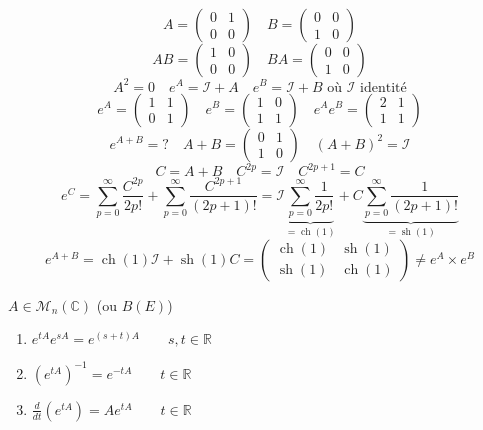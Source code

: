 \documentclass[a4paper]{report}
\newcommand\R{\ensuremath{\mathbb{R}}}
\theoremstyle{definition}
\begin{document}
\begin{remark}
   \[
        A = \begin{pmatrix} 
            0 & 1\\
            0 & 0
        \end{pmatrix}  
        \quad
        B = \begin{pmatrix} 
            0 & 0 \\
            1 & 0
        \end{pmatrix} 
   \]  
   \[
       AB = \begin{pmatrix} 1 & 0 \\ 0 & 0 \end{pmatrix} 
       \quad 
       BA = \begin{pmatrix} 0 & 0 \\ 1 & 0 \end{pmatrix} 
   \] 
   \[
       A^2 = 0 \quad e^A = \mathcal{I} + A \quad e^B = \mathcal{I} + B \text{ où } \mathcal{I} \text{ identité}
   \] 
   \[
       e^A = \begin{pmatrix} 1 & 1 \\ 0 & 1 \end{pmatrix} 
       \quad 
       e^B = \begin{pmatrix} 1 & 0 \\ 1 & 1 \end{pmatrix} 
       \quad 
       e^Ae^B = \begin{pmatrix} 2 & 1 \\ 1 & 1 \end{pmatrix} 
   \] 
   \[
       e^{A+B} = ? \quad A + B = \begin{pmatrix} 0 & 1 \\ 1 & 0 \end{pmatrix} \quad (A + B)^2 = \mathcal{I}
   \] 
   \[
       C = A+B \quad C^{2p} = \mathcal{I} \quad C^{2p + 1} = C
   \] 
   \[
       e^C = \sum_{p=0}^{\infty} \frac{C^{2p}}{2p!} + \sum_{p=0}^{\infty} \frac{C^{2p + 1}}{(2p + 1)!} = \mathcal{I}\underbrace{\sum_{p=0}^{\infty} \frac{1}{2p!}}_{= \operatorname{ch}(1)} + C\underbrace{\sum_{p=0}^{\infty} \frac{1}{(2p + 1)!}}_{= \operatorname{sh}(1)}
   \] 
   \[
       e^{A + B} = \operatorname{ch}(1) \mathcal{I} + \operatorname{sh}(1)C = \begin{pmatrix} \operatorname{ch}(1) & \operatorname{sh}(1) \\ \operatorname{sh}(1) & \operatorname{ch}(1) \end{pmatrix} \neq e^A \times e^B
   \] 
\end{remark}
\begin{prop}
    $A \in \mathcal{M}_n(\mathbb{C})$ (ou $B(E)$)
    \begin{enumerate}
        \item $e^{tA}e^{sA} = e^{(s + t)A} \qquad s,t \in \R$ 
        \item $(e^{tA})^{-1} = e^{-tA} \qquad  t \in \R$
        \item $\frac{d}{dt}(e^{tA}) = Ae^{tA} \qquad t \in \R$
    \end{enumerate}
\end{prop}
\end{document}
